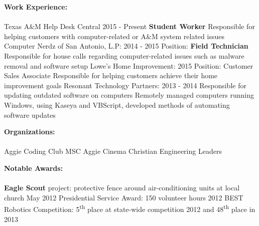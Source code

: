 \documentclass[12pt]{article}
\newcommand{\upspace}{\vspace{0px}}
\newcommand{\zzz}[1]{\upspace \0 \textbf{#1} \\ \vspace{-0.8\baselineskip} \hrulefill \vspace{-2px} \\ }
\newcommand{\aaa}{\upspace \1}
\newcommand{\bbb}{\upspace \2}
\begin{document}
\begin{flushleft}
\begin{outline}[compactitem]
\zzz{Work Experience:}
	\aaa Texas A\&M Help Desk Central \hfill 2015 - Present
		\bbb \textbf{Student Worker}
		\bbb Responsible for helping customers with computer-related or A\&M system related issues
	\aaa Computer Nerdz of San Antonio, L.P: \hfill 2014 - 2015
		\bbb Position: \textbf{Field Technician}
		\bbb Responsible for house calls regarding computer-related issues such as malware removal and software setup
	\aaa Lowe's Home Improvement: \hfill 2015
		\bbb Position: Customer Sales Associate
		\bbb Responsible for helping customers achieve their home improvement goals
	\aaa Resonant Technology Partners: \hfill 2013 - 2014
		\bbb Responsible for updating outdated software on computers
		\bbb Remotely managed computers running Windows, using Kaseya and VBScript, developed methods of automating software updates

\zzz{Organizations:}
	\aaa Aggie Coding Club \hfill{}\hspace{1px} MSC Aggie Cinema \hfill{}\hspace{1px} Christian Engineering Leaders

\zzz{Notable Awards:}
	\aaa \textbf{Eagle Scout} project: protective fence around air-conditioning units at local church \hfill May 2012
	\aaa Presidential Service Award: 150 volunteer hours \hfill 2012
	\aaa BEST Robotics Competition: 5\textsuperscript{th} place at state-wide competition 2012 and 48\textsuperscript{th} place in 2013

\end{outline}
\end{flushleft}
\end{document}
